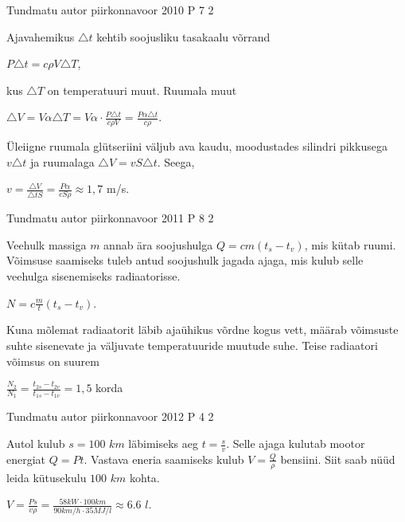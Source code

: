 \documentclass[11pt]{article}
\begin{document}
{%
{Tundmatu autor} %
{piirkonnavoor} %
{2010} %
{P 7} %
{2} %
{

\ifSolution
Ajavahemikus $\triangle t$ kehtib soojusliku tasakaalu võrrand
\begin{center}
$P \triangle t = c \rho V \triangle T$,
\end{center}
kus $\triangle T$ on temperatuuri muut. Ruumala muut 
\begin{center}
$\triangle V = V \alpha \triangle T = V \alpha \cdot \frac{P \triangle t}{c \rho V} = \frac{P \alpha \triangle t}{c \rho}$.
\end{center}
Üleiigne ruumala glütseriini väljub ava kaudu, moodustades silindri pikkusega $v \triangle t$ ja ruumalaga $\triangle V = v S \triangle t$. Seega,
\begin{center}
$v = \frac{\triangle V}{\triangle t S} = \frac{P \alpha}{cS \rho} \approx 1,7$ m/s.
\end{center}
\fi
}

{Tundmatu autor} %
{piirkonnavoor} %
{2011} %
{P 8} %
{2} %
{

\ifSolution
Veehulk massiga $m$ annab ära soojushulga $Q = cm(t_s - t_v)$, mis kütab ruumi. Võimsuse saamiseks tuleb antud soojushulk jagada ajaga, mis kulub selle veehulga sisenemiseks radiaatorisse.
\begin{center}
$N = c\frac{m}{t}(t_s - t_v)$.
\end{center}
Kuna mõlemat radiaatorit läbib ajaühikus võrdne kogus vett, määrab võimsuste suhte sisenevate ja väljuvate temperatuuride muutude suhe. Teise radiaatori võimsus on suurem
\begin{center}
$\frac{N_2}{N_1} = \frac{t_{2s} - t_{2v}}{t_{1s} - t_{1v}} = 1,5$ korda
\end{center}
\fi
}

{Tundmatu autor} %
{piirkonnavoor} %
{2012} %
{P 4} %
{2} %
{

\ifSolution
Autol kulub $s = 100$ $km$ läbimiseks aeg $t = \frac{s}{v}$. Selle ajaga kulutab mootor energiat $Q = Pt$. Vastava eneria saamiseks kulub $V = \frac{Q}{\rho}$ bensiini. Siit saab nüüd leida kütusekulu $100$ $km$ kohta.
\begin{center}
$V = \frac{Ps}{v \rho} = \frac{58 kW \cdot 100 km}{90 km/h \cdot 35 MJ/l} \approx 6.6$ $l$.
\end{center}
\fi
}

}
\end{document}
